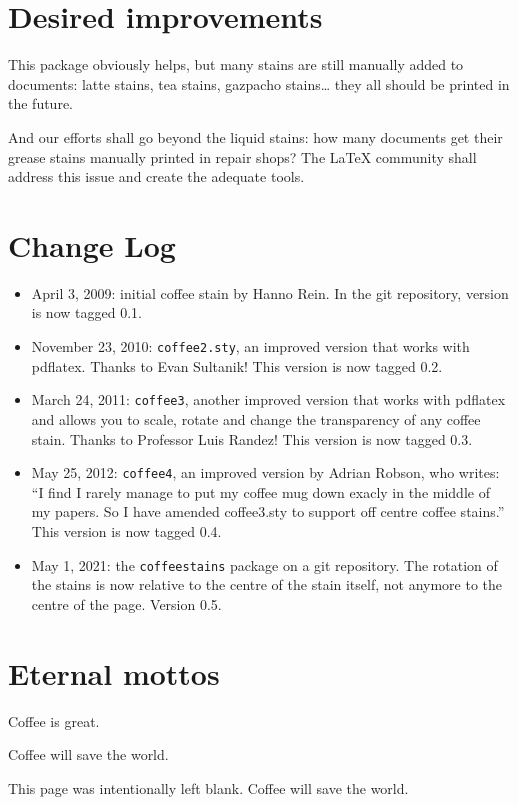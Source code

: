 \documentclass[a4paper, 11pt, BCOR = 0 pt, oneside, english]{scrartcl}
\begin{document}
\section{Desired improvements}
This package obviously helps, but many stains are still manually added to
documents: latte stains, tea stains, gazpacho stains\dots{} they all should be
printed in the future.

And our efforts shall go beyond the liquid stains: how many documents get their
grease stains manually printed in repair shops? The \LaTeX{} community shall
address this issue and create the adequate tools.

\section{Change Log}
\begin{itemize}
\item April 3, 2009: initial coffee stain by Hanno Rein. In the git repository,
  version is now tagged 0.1.
\item November 23, 2010: \texttt{coffee2.sty}, an improved version that works
  with pdflatex. Thanks to Evan Sultanik! This version is now tagged 0.2.
\item March 24, 2011: \texttt{coffee3}, another improved version that works
  with pdflatex and allows you to scale, rotate and change the transparency of
  any coffee stain. Thanks to Professor Luis Randez! This version is now tagged
  0.3.
\item May 25, 2012: \texttt{coffee4}, an improved version by Adrian Robson, who
  writes: “I find I rarely manage to put my coffee mug down exacly in the middle
  of my papers.  So I have amended coffee3.sty to support off centre coffee
  stains.” This version is now tagged 0.4.
\item May 1, 2021: the \texttt{coffeestains} package on a git
  repository. The rotation of the stains is now relative to the centre of the
  stain itself, not anymore to the centre of the page. Version 0.5.
\end{itemize}

\section{Eternal mottos}

Coffee is great.

\vspace{5mm}

\noindent{}
Coffee will save the world.

\newpage
\vfill{}
This page was intentionally left blank.
\vfill{}
\newpage
{}
\newpage
{}
Coffee will save the world.
\end{document}
